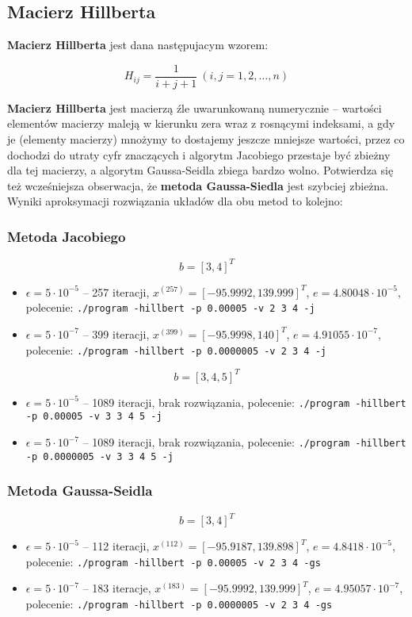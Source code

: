 \documentclass[a4paper,11pt]{article}
\begin{document}
\subsection{Macierz Hillberta}
  \textbf{Macierz Hillberta} jest dana następujacym wzorem:
    
    $$ H_{ij} = \frac {1} {i + j + 1} \: (i, j = 1, 2, \dots, n) $$
    
  \textbf{Macierz Hillberta} jest macierzą źle uwarunkowaną numerycznie -- wartości 
  elementów macierzy maleją w kierunku zera wraz z rosnącymi indeksami, a gdy je (elementy macierzy)
  mnożymy to dostajemy jeszcze mniejsze wartości, przez co dochodzi do utraty cyfr znaczących
  i algorytm Jacobiego przestaje być zbieżny dla tej macierzy, a algorytm Gaussa-Seidla 
  zbiega bardzo wolno. Potwierdza się też wcześniejsza obserwacja, że 
  \textbf{metoda Gaussa-Siedla} jest szybciej zbieżna. Wyniki aproksymacji rozwiązania 
  układów dla obu metod to kolejno:
    \subsubsection{Metoda Jacobiego}
      $$ b = [3, 4]^T $$
    \begin{itemize}
      \item $ \epsilon = 5 \cdot 10^{-5} $ -- 257 iteracji, $ x^{(257)} = [-95.9992, 139.999]^T $, $ e = 4.80048 \cdot 10^{-5} $,
            polecenie: \texttt{./program -hillbert -p 0.00005 -v 2 3 4 -j}
      \item $ \epsilon = 5 \cdot 10^{-7} $ -- 399 iteracji, $ x^{(399)} = [-95.9998, 140]^T $, $ e = 4.91055 \cdot 10^{-7} $,
            polecenie: \texttt{./program -hillbert -p 0.0000005 -v 2 3 4 -j}
    \end{itemize}
    
    $$ b = [3, 4, 5]^T $$
    \begin{itemize}
      \item $ \epsilon = 5 \cdot 10^{-5} $ -- 1089 iteracji, brak rozwiązania,
            polecenie: \texttt{./program -hillbert -p 0.00005 -v 3 3 4 5 -j}
      \item $ \epsilon = 5 \cdot 10^{-7} $ -- 1089 iteracji, brak rozwiązania,
            polecenie: \texttt{./program -hillbert -p 0.0000005 -v 3 3 4 5 -j}
    \end{itemize}
    
    \subsubsection{Metoda Gaussa-Seidla}
      $$ b = [3, 4]^T $$
    \begin{itemize}
      \item $ \epsilon = 5 \cdot 10^{-5} $ -- 112 iteracji, $ x^{(112)} = [-95.9187, 139.898]^T $, $ e = 4.8418 \cdot 10^{-5} $,
            polecenie: \texttt{./program -hillbert -p 0.00005 -v 2 3 4 -gs}
      \item $ \epsilon = 5 \cdot 10^{-7} $ -- 183 iteracje, $ x^{(183)} = [-95.9992, 139.999]^T $, $ e = 4.95057 \cdot 10^{-7} $,
            polecenie: \texttt{./program -hillbert -p 0.0000005 -v 2 3 4 -gs}
    \end{itemize}
    
\end{document}
